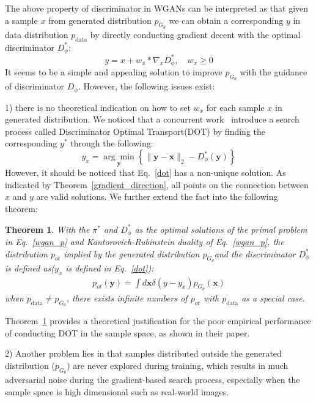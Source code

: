 \documentclass{article}
\newtheorem{theorem}{Theorem}
\begin{document}
The above  property of discriminator in WGANs can be interpreted as that given a sample $x$ from generated distribution $p_{G_\theta}$ we can obtain a corresponding $y$ in data distribution $p_{\text{data}}$ by directly conducting gradient decent with the optimal discriminator $D_\phi^{*}$:
\begin{equation}
\label{add grad}
        y = x + w_x*\nabla_{x} D_\phi^{*},\quad w_x \geq 0
\end{equation}
It seems to be a simple and appealing solution to improve $p_{G_\theta}$ with the guidance of discriminator $D_\phi$. However, the following issues exist: 

1) there is no theoretical indication on how to set $w_x$ for each sample $x$ in generated distribution. We noticed that a concurrent work~\cite{tanaka2019discriminator} introduce a search process called Discriminator Optimal Transport(DOT) by finding the corresponding $y^{*}$ through the following:
\begin{equation}
\label{dot}
    y_x =\underset{\boldsymbol{y}}{\arg \min }\left\{\|\boldsymbol{y}-\boldsymbol{x}\|_{2}-D_\phi^{*}(\boldsymbol{y})\right\}
\end{equation}
However, it should be noticed that Eq.~\ref{dot} has a non-unique solution. As indicated by Theorem~\ref{gradient_direction}, all points on the connection between $x$ and $y$ are valid solutions. We further extend the fact into the following theorem:
\begin{theorem}
\label{opt_fail}
    With the $\pi ^{*}$ and $D_\phi^{*}$ as the optimal solutions of the primal problem in Eq.~\ref{wgan_p} and  Kantorovich-Rubinstein duality of Eq.~\ref{wgan_p}, the distribution $p_{ot}$ implied by the generated distribution $p_{G_\theta}$and the discriminator $D_\phi^{*}$ is defined as($y_x$ is defined in Eq.~\ref{dot}):
    \begin{align*}
       p_{ot}(\boldsymbol{y})=\int d \boldsymbol{x} \delta(y-y_x) p_{G_\theta}(\boldsymbol{x})
    \end{align*}
    when $p_{\text{data}} \neq p_{G_\theta}$, there exists infinite numbers of $p_{ot}$ with $p_{\text{data}}$ as a special case. 
\end{theorem}
Theorem~\ref{opt_fail} provides a theoretical justification for the poor empirical performance of conducting DOT in the sample space, as shown in their paper.

2) Another problem lies in that samples distributed outside the generated distribution ($p_{G_\theta}$) are never explored during training, which results in much adversarial noise during the gradient-based search process, especially when the sample space is high dimensional such as real-world images. 
\end{document}
